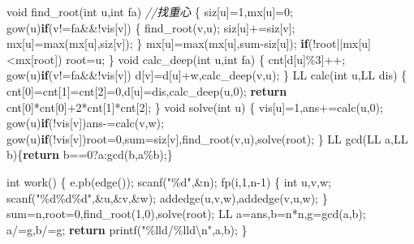 \documentclass[
]{article}
\newenvironment{Shaded}{}{}
\newcommand{\CommentTok}[1]{\textcolor[rgb]{0.38,0.63,0.69}{\textit{#1}}}
\newcommand{\ControlFlowTok}[1]{\textcolor[rgb]{0.00,0.44,0.13}{\textbf{#1}}}
\newcommand{\DataTypeTok}[1]{\textcolor[rgb]{0.56,0.13,0.00}{#1}}
\newcommand{\DecValTok}[1]{\textcolor[rgb]{0.25,0.63,0.44}{#1}}
\newcommand{\NormalTok}[1]{#1}
\newcommand{\SpecialCharTok}[1]{\textcolor[rgb]{0.25,0.44,0.63}{#1}}
\newcommand{\StringTok}[1]{\textcolor[rgb]{0.25,0.44,0.63}{#1}}
\begin{document}
\begin{Shaded}
\begin{Highlighting}[]
\DataTypeTok{void}\NormalTok{ find\_root(}\DataTypeTok{int}\NormalTok{ u,}\DataTypeTok{int}\NormalTok{ fa) }\CommentTok{//找重心}
\NormalTok{\{}
\NormalTok{    siz[u]=}\DecValTok{1}\NormalTok{,mx[u]=}\DecValTok{0}\NormalTok{;}
\NormalTok{    gow(u)}\ControlFlowTok{if}\NormalTok{(v!=fa\&\&!vis[v])}
\NormalTok{    \{}
\NormalTok{        find\_root(v,u);}
\NormalTok{        siz[u]+=siz[v];}
\NormalTok{        mx[u]=max(mx[u],siz[v]);}
\NormalTok{    \}}
\NormalTok{    mx[u]=max(mx[u],sum{-}siz[u]);}
    \ControlFlowTok{if}\NormalTok{(!root||mx[u]\textless{}mx[root]) root=u;}
\NormalTok{\}}
\DataTypeTok{void}\NormalTok{ calc\_deep(}\DataTypeTok{int}\NormalTok{ u,}\DataTypeTok{int}\NormalTok{ fa) }
\NormalTok{\{}
\NormalTok{    cnt[d[u]\%}\DecValTok{3}\NormalTok{]++;}
\NormalTok{    gow(u)}\ControlFlowTok{if}\NormalTok{(v!=fa\&\&!vis[v])}
\NormalTok{        d[v]=d[u]+w,calc\_deep(v,u);}
\NormalTok{\}}
\NormalTok{LL calc(}\DataTypeTok{int}\NormalTok{ u,LL dis)}
\NormalTok{\{}
\NormalTok{    cnt[}\DecValTok{0}\NormalTok{]=cnt[}\DecValTok{1}\NormalTok{]=cnt[}\DecValTok{2}\NormalTok{]=}\DecValTok{0}\NormalTok{,d[u]=dis,calc\_deep(u,}\DecValTok{0}\NormalTok{);}
    \ControlFlowTok{return}\NormalTok{ cnt[}\DecValTok{0}\NormalTok{]*cnt[}\DecValTok{0}\NormalTok{]+}\DecValTok{2}\NormalTok{*cnt[}\DecValTok{1}\NormalTok{]*cnt[}\DecValTok{2}\NormalTok{];}
\NormalTok{\}}
\DataTypeTok{void}\NormalTok{ solve(}\DataTypeTok{int}\NormalTok{ u)}
\NormalTok{\{}
\NormalTok{    vis[u]=}\DecValTok{1}\NormalTok{,ans+=calc(u,}\DecValTok{0}\NormalTok{);}
\NormalTok{    gow(u)}\ControlFlowTok{if}\NormalTok{(!vis[v])ans{-}=calc(v,w);}
\NormalTok{    gow(u)}\ControlFlowTok{if}\NormalTok{(!vis[v])root=}\DecValTok{0}\NormalTok{,sum=siz[v],find\_root(v,u),solve(root);}
\NormalTok{\}}
\NormalTok{LL gcd(LL a,LL b)\{}\ControlFlowTok{return}\NormalTok{ b==}\DecValTok{0}\NormalTok{?a:gcd(b,a\%b);\}}

\DataTypeTok{int}\NormalTok{ work()}
\NormalTok{\{}
\NormalTok{    e.pb(edge());}
\NormalTok{    scanf(}\StringTok{"}\SpecialCharTok{\%d}\StringTok{"}\NormalTok{,\&n);}
\NormalTok{    fp(i,}\DecValTok{1}\NormalTok{,n{-}}\DecValTok{1}\NormalTok{)}
\NormalTok{    \{}
        \DataTypeTok{int}\NormalTok{ u,v,w;}
\NormalTok{        scanf(}\StringTok{"}\SpecialCharTok{\%d\%d\%d}\StringTok{"}\NormalTok{,\&u,\&v,\&w);}
\NormalTok{        addedge(u,v,w),addedge(v,u,w);}
\NormalTok{    \}}
\NormalTok{    sum=n,root=}\DecValTok{0}\NormalTok{,find\_root(}\DecValTok{1}\NormalTok{,}\DecValTok{0}\NormalTok{),solve(root);}
\NormalTok{    LL a=ans,b=n*n,g=gcd(a,b); a/=g,b/=g;}
    \ControlFlowTok{return}\NormalTok{ printf(}\StringTok{"}\SpecialCharTok{\%lld}\StringTok{/}\SpecialCharTok{\%lld\textbackslash{}n}\StringTok{"}\NormalTok{,a,b);}
\NormalTok{\}}
\end{Highlighting}
\end{Shaded}
\end{document}
